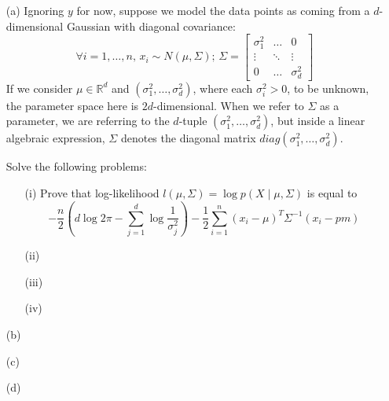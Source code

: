\documentclass{article}
\begin{document}
    \begin{itemize}
        \item [(a)] Ignoring $y$ for now, suppose we model the data points as coming from a $d$-dimensional Gaussian with diagonal covariance:
            \begin{equation*}
                \forall i = 1, \ldots, n, \, x_{i} \sim N(\mu, \Sigma); \, \Sigma = \begin{bmatrix}
                    \sigma_{1}^{2} & \ldots & 0              \\
                    \vdots         & \ddots & \vdots         \\
                    0              & \ldots & \sigma^{2}_{d}   
                \end{bmatrix}
            \end{equation*}
        If we consider $\mu \in \mathbb{R}^{d}$ and $(\sigma^{2}_{1}, \ldots, \sigma^{2}_{d})$, where each $\sigma^{2}_{i} > 0$, to be unknown, the parameter space here is $2d$-dimensional. When we refer to $\Sigma$ as a parameter, we are referring to the $d$-tuple $(\sigma_{1}^{2}, \ldots, \sigma^{2}_{d})$, but inside a linear algebraic expression, $\Sigma$ denotes the diagonal matrix $diag(\sigma_{1}^{2}, \ldots, \sigma^{2}_{d})$.

        Solve the following problems:
            \begin{itemize}
                \item [(i)] Prove that log-likelihood $l(\mu, \Sigma) = \log{p(X \mid \mu, \Sigma)}$ is equal to
                    \begin{equation*}
                        -\dfrac{n}{2} \left(d \log{2\pi} - \sum_{j = 1}^{d} \log{ \dfrac{1}{\sigma^{2}_{j}}}\right) - \dfrac{1}{2}\sum_{i = 1}^{n}(x_{i} - \mu)^{T}\Sigma^{-1}(x_{i} - pm)
                    \end{equation*}

                \item [(ii)]

                \item [(iii)]

                \item [(iv)]
            \end{itemize}

        \item [(b)]

        \item [(c)]

        \item [(d)]
    \end{itemize}
\end{document}
